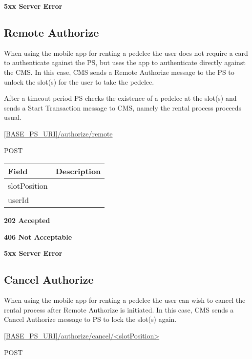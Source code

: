  \textbf{5xx Server Error}

\subsection{Remote Authorize}

When using the mobile app for renting a pedelec the user does not require a card to authenticate against the \acs{PS}, but uses the app to authenticate directly against the \acs{CMS}. In this case, \acs{CMS} sends a Remote Authorize message to the \acs{PS} to unlock the slot(s) for the user to take the pedelec. 

After a timeout period \acs{PS} checks the existence of a pedelec at the slot(s) and sends a Start Transaction message to \acs{CMS}, namely the rental process proceeds usual.


 \url{[BASE_PS_URI]/authorize/remote}

 POST

\begin{table}[!h]
\vspace{-7mm}
\begin{tabularx}{\linewidth}{ | l | X | }
  \hline
  \rowcolor{table-head}
  Field & Description \\
  \hline
  slotPosition 		&  \\
  userId		&  \\
  \hline
\end{tabularx}
\end{table}

 \textbf{202 Accepted}

 \textbf{406 Not Acceptable}

\textbf{5xx Server Error}

\subsection{Cancel Authorize}

When using the mobile app for renting a pedelec the user can wish to cancel the rental process after Remote Authorize is initiated. In this case, \acs{CMS} sends a Cancel Authorize message to \acs{PS} to lock the slot(s) again.

 \url{[BASE_PS_URI]/authorize/cancel/<slotPosition>}

 POST

